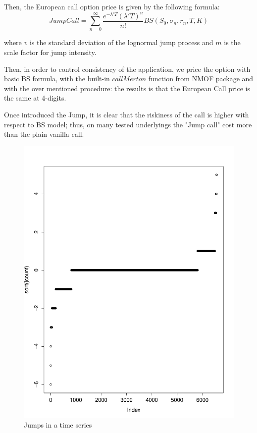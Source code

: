 \documentclass[paper=a4, fontsize=12pt]{scrartcl} %
\numberwithin{equation}{section}
\begin{document}
Then, the European call option price is given by the following formula:
	\begin{equation}
		JumpCall = \sum^{\infty}_{n=0} \frac{e^{-\lambda ' T}(\lambda ' T)^n}{n!} BS(S_0, \sigma_n, r_n, T, K)
	\end{equation}

where $v$ is the standard deviation of the lognormal jump process and $m$ is the scale factor for jump intensity.

Then, in order to control consistency of the application, we price the option with basic BS formula, with the built-in $callMerton$ function from NMOF package and with the over mentioned procedure: the results is that the European Call price is the same at 4-digits. \par
Once introduced the Jump, it is clear that the riskiness of the call is higher with respect to BS model; thus, on many tested underlyings the "Jump call" cost more than the plain-vanilla call.

\begin{figure}[t]
\caption{Jumps in a time series}
\includegraphics[scale=0.5]{Jump}
\centering
\end{figure}
\end{document}
